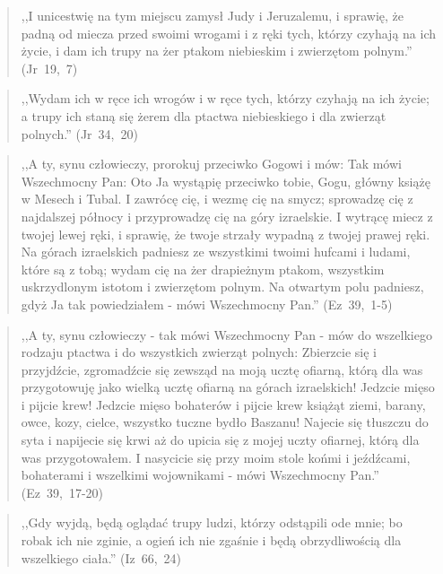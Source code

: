 \documentclass[10pt,a4paper,oneside]{article}
\begin{document}
\begin{quote}
,,I unicestwię na tym miejscu zamysł Judy i Jeruzalemu, i sprawię, że padną od miecza przed swoimi wrogami i z ręki tych, którzy czyhają na ich życie, i dam ich trupy na żer ptakom niebieskim i zwierzętom polnym.'' \mbox{(Jr 19, 7)}
\end{quote}
\begin{quote}
,,Wydam ich w ręce ich wrogów i w ręce tych, którzy czyhają na ich życie; a trupy ich staną się żerem dla ptactwa niebieskiego i dla zwierząt polnych.'' \mbox{(Jr 34, 20)}
\end{quote}
\begin{quote}
,,A ty, synu człowieczy, prorokuj przeciwko Gogowi i mów: Tak mówi Wszechmocny Pan: Oto Ja wystąpię przeciwko tobie, Gogu, główny książę w Mesech i Tubal. I zawrócę cię, i wezmę cię na smycz; sprowadzę cię z najdalszej północy i przyprowadzę cię na góry izraelskie. I wytrącę miecz z twojej lewej ręki, i sprawię, że twoje strzały wypadną z twojej prawej ręki. Na górach izraelskich padniesz ze wszystkimi twoimi hufcami i ludami, które są z tobą; wydam cię na żer drapieżnym ptakom, wszystkim uskrzydlonym istotom i zwierzętom polnym. Na otwartym polu padniesz, gdyż Ja tak powiedziałem - mówi Wszechmocny Pan.'' \mbox{(Ez 39, 1-5)}
\end{quote}
\begin{quote}
,,A ty, synu człowieczy - tak mówi Wszechmocny Pan - mów do wszelkiego rodzaju ptactwa i do wszystkich zwierząt polnych: Zbierzcie się i przyjdźcie, zgromadźcie się zewsząd na moją ucztę ofiarną, którą dla was przygotowuję jako wielką ucztę ofiarną na górach izraelskich! Jedzcie mięso i pijcie krew! Jedzcie mięso bohaterów i pijcie krew książąt ziemi, barany, owce, kozy, cielce, wszystko tuczne bydło Baszanu! Najecie się tłuszczu do syta i napijecie się krwi aż do upicia się z mojej uczty ofiarnej, którą dla was przygotowałem. I nasycicie się przy moim stole końmi i jeźdźcami, bohaterami i wszelkimi wojownikami - mówi Wszechmocny Pan.'' \mbox{(Ez 39, 17-20)}
\end{quote}
\begin{quote}
,,Gdy wyjdą, będą oglądać trupy ludzi, którzy odstąpili ode mnie; bo robak ich nie zginie, a ogień ich nie zgaśnie i będą obrzydliwością dla wszelkiego ciała.'' \mbox{(Iz 66, 24)}
\end{quote}
\end{document}
